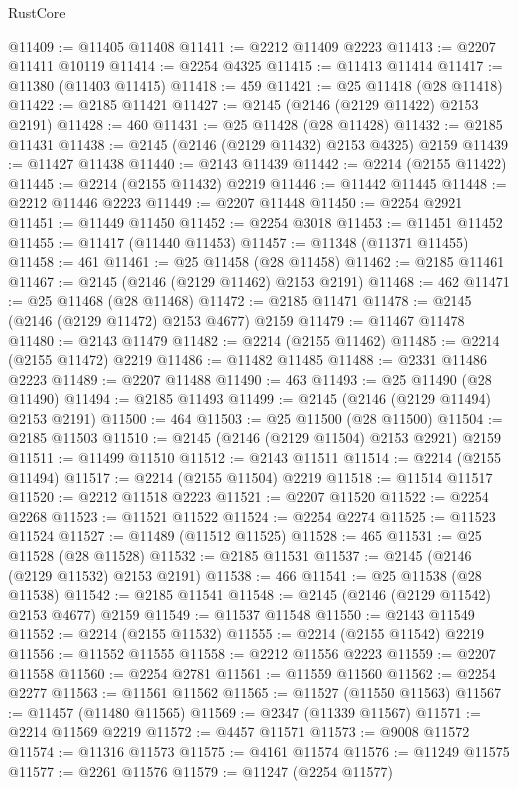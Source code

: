 \begin{lexlean}{RustCore}
\begin{coremodule}
@11409 := @11405 @11408
@11411 := @2212 @11409 @2223
@11413 := @2207 @11411 @10119
@11414 := @2254 @4325
@11415 := @11413 @11414
@11417 := @11380 (@11403 @11415)
@11418 := 459
@11421 := @25 @11418 (@28 @11418)
@11422 := @2185 @11421
@11427 := @2145 (@2146 (@2129 @11422) @2153 @2191)
@11428 := 460
@11431 := @25 @11428 (@28 @11428)
@11432 := @2185 @11431
@11438 := @2145 (@2146 (@2129 @11432) @2153 @4325) @2159
@11439 := @11427 @11438
@11440 := @2143 @11439
@11442 := @2214 (@2155 @11422)
@11445 := @2214 (@2155 @11432) @2219
@11446 := @11442 @11445
@11448 := @2212 @11446 @2223
@11449 := @2207 @11448
@11450 := @2254 @2921
@11451 := @11449 @11450
@11452 := @2254 @3018
@11453 := @11451 @11452
@11455 := @11417 (@11440 @11453)
@11457 := @11348 (@11371 @11455)
@11458 := 461
@11461 := @25 @11458 (@28 @11458)
@11462 := @2185 @11461
@11467 := @2145 (@2146 (@2129 @11462) @2153 @2191)
@11468 := 462
@11471 := @25 @11468 (@28 @11468)
@11472 := @2185 @11471
@11478 := @2145 (@2146 (@2129 @11472) @2153 @4677) @2159
@11479 := @11467 @11478
@11480 := @2143 @11479
@11482 := @2214 (@2155 @11462)
@11485 := @2214 (@2155 @11472) @2219
@11486 := @11482 @11485
@11488 := @2331 @11486 @2223
@11489 := @2207 @11488
@11490 := 463
@11493 := @25 @11490 (@28 @11490)
@11494 := @2185 @11493
@11499 := @2145 (@2146 (@2129 @11494) @2153 @2191)
@11500 := 464
@11503 := @25 @11500 (@28 @11500)
@11504 := @2185 @11503
@11510 := @2145 (@2146 (@2129 @11504) @2153 @2921) @2159
@11511 := @11499 @11510
@11512 := @2143 @11511
@11514 := @2214 (@2155 @11494)
@11517 := @2214 (@2155 @11504) @2219
@11518 := @11514 @11517
@11520 := @2212 @11518 @2223
@11521 := @2207 @11520
@11522 := @2254 @2268
@11523 := @11521 @11522
@11524 := @2254 @2274
@11525 := @11523 @11524
@11527 := @11489 (@11512 @11525)
@11528 := 465
@11531 := @25 @11528 (@28 @11528)
@11532 := @2185 @11531
@11537 := @2145 (@2146 (@2129 @11532) @2153 @2191)
@11538 := 466
@11541 := @25 @11538 (@28 @11538)
@11542 := @2185 @11541
@11548 := @2145 (@2146 (@2129 @11542) @2153 @4677) @2159
@11549 := @11537 @11548
@11550 := @2143 @11549
@11552 := @2214 (@2155 @11532)
@11555 := @2214 (@2155 @11542) @2219
@11556 := @11552 @11555
@11558 := @2212 @11556 @2223
@11559 := @2207 @11558
@11560 := @2254 @2781
@11561 := @11559 @11560
@11562 := @2254 @2277
@11563 := @11561 @11562
@11565 := @11527 (@11550 @11563)
@11567 := @11457 (@11480 @11565)
@11569 := @2347 (@11339 @11567)
@11571 := @2214 @11569 @2219
@11572 := @4457 @11571
@11573 := @9008 @11572
@11574 := @11316 @11573
@11575 := @4161 @11574
@11576 := @11249 @11575
@11577 := @2261 @11576
@11579 := @11247 (@2254 @11577)

\end{coremodule}
\end{lexlean}

